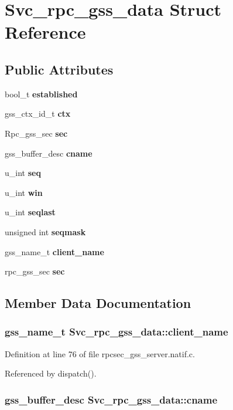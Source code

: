 \section{Svc\_\-rpc\_\-gss\_\-data Struct Reference}
\label{structSvc__rpc__gss__data}
\subsection*{Public Attributes}
\begin{CompactItemize}
\item 
bool\_\-t {\bf established}
\item 
gss\_\-ctx\_\-id\_\-t {\bf ctx}
\item 
Rpc\_\-gss\_\-sec {\bf sec}
\item 
gss\_\-buffer\_\-desc {\bf cname}
\item 
u\_\-int {\bf seq}
\item 
u\_\-int {\bf win}
\item 
u\_\-int {\bf seqlast}
\item 
unsigned int {\bf seqmask}
\item 
gss\_\-name\_\-t {\bf client\_\-name}
\item 
rpc\_\-gss\_\-sec {\bf sec}
\end{CompactItemize}


\subsection{Member Data Documentation}
\subsubsection{\setlength{\rightskip}{0pt plus 5cm}gss\_\-name\_\-t {\bf Svc\_\-rpc\_\-gss\_\-data::client\_\-name}}\label{structSvc__rpc__gss__data_o8}




Definition at line 76 of file rpcsec\_\-gss\_\-server.natif.c.

Referenced by dispatch().
\subsubsection{\setlength{\rightskip}{0pt plus 5cm}gss\_\-buffer\_\-desc {\bf Svc\_\-rpc\_\-gss\_\-data::cname}}\label{structSvc__rpc__gss__data_o3}




